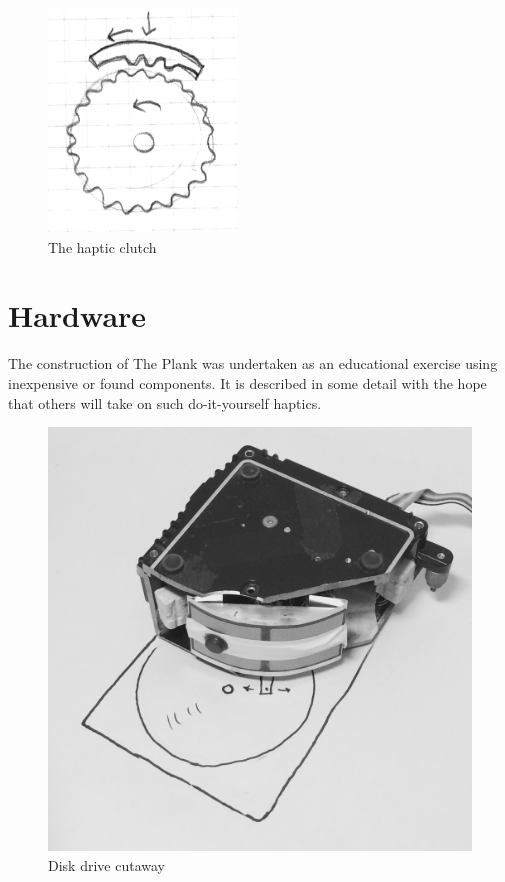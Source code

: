 \begin{figure}[ht]
\centering
\includegraphics[width=5cm]{Plank3}
%
%
\caption{The haptic clutch}
\label{Verplank:fig:3}       %
\end{figure}

\section{Hardware}

The construction of The Plank was undertaken as an educational exercise using inexpensive or found components. It is described in some detail with the hope that others will take on such do-it-yourself haptics.

\begin{figure}[ht]
\centering

\includegraphics[width=11.3cm]{Plank4}
%
%
\caption{Disk drive cutaway}
\label{Verplank:fig:4}       %
\end{figure}


